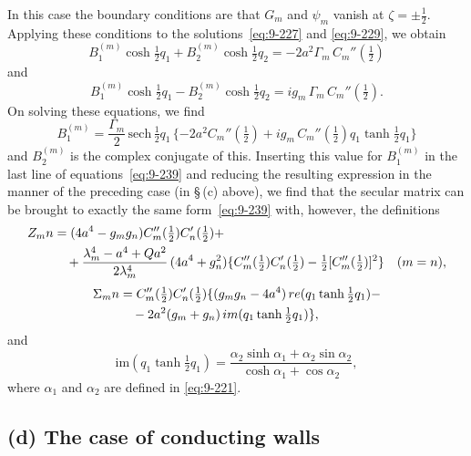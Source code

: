 In this case the boundary conditions are that $G_m$ and $\psi_m$ vanish at $\zeta = \pm\frac{1}{2}$. Applying these conditions to the solutions~\eqref{eq:9-227} and \eqref{eq:9-229}, we obtain
\begin{equation}
B_1^{(m)}\cosh\tfrac{1}{2}q_1 + B_2^{(m)}\cosh\tfrac{1}{2}q_2 = -2a^2\Gamma_m\, C_m''(\tfrac{1}{2}) \label{eq:9-240}
\end{equation}
and
\begin{equation}
B_1^{(m)}\cosh\tfrac{1}{2}q_1 - B_2^{(m)}\cosh\tfrac{1}{2}q_2 = ig_m\,\Gamma_m\, C_m''(\tfrac{1}{2}). \label{eq:9-241}
\end{equation}
On solving these equations, we find
\begin{equation}
B_1^{(m)} = \frac{\Gamma_m}{2}\,\mathrm{sech}\,\tfrac{1}{2}q_1\, \{-2a^2 C_m''(\tfrac{1}{2}) + ig_m\,C_m''(\tfrac{1}{2})q_1\tanh\tfrac{1}{2}q_1\} \label{eq:9-241a}
\end{equation}
and $B_2^{(m)}$ is the complex conjugate of this. Inserting this value for $B_1^{(m)}$ in the last line of equations~\eqref{eq:9-239} and reducing the resulting expression in the manner of the preceding case (in \S\,(c) above), we find that the secular matrix can be brought to exactly the same form~\eqref{eq:9-239} with, however, the definitions
\begin{align}
Z_\mathrm{mn} &= (4a^4 - g_m g_n)C_m''(\tfrac{1}{2})C_n'(\tfrac{1}{2}) + \notag \\
&\quad + \frac{\lambda_m^4 - a^4 + Qa^2}{2\lambda_m^4}\,(4a^4 + g_n^2)\{C_m''(\tfrac{1}{2})C_n'(\tfrac{1}{2}) - \tfrac{1}{2}[C_m''(\tfrac{1}{2})]^2\} \quad (m = n), \label{eq:9-249}
\end{align}
\begin{align}
\Sigma_\mathrm{mn} &= C_m''(\tfrac{1}{2})C_n'(\tfrac{1}{2})\{(g_m g_n - 4a^4)\,\mathrm{re}(q_1\tanh\tfrac{1}{2}q_1) - \notag \\
&\quad - 2a^2(g_m + g_n)\,\mathrm{im}(q_1\tanh\tfrac{1}{2}q_1)\}, \label{eq:9-250}
\end{align}
and
\begin{equation}
\mathrm{im}(q_1\tanh\tfrac{1}{2}q_1) = \frac{\alpha_2\sinh\alpha_1 + \alpha_2\sin\alpha_2}{\cosh\alpha_1 + \cos\alpha_2}, \label{eq:9-251}
\end{equation}
where $\alpha_1$ and $\alpha_2$ are defined in \eqref{eq:9-221}.

\subsection*{(d) The case of conducting walls}

